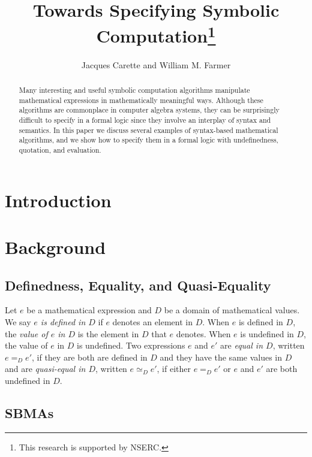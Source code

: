 \documentclass[fleqn]{llncs}
\title{Towards Specifying Symbolic Computation\thanks{This research is
    supported by NSERC.}}
\author{Jacques Carette and William M. Farmer}
\institute{%
Computing and Software, McMaster University, Canada\\
\url{http://www.cas.mcmaster.ca/~carette}\\
\url{http://imps.mcmaster.ca/wmfarmer}\\[1.5ex]
}
\begin{document}
\maketitle

\begin{abstract}

Many interesting and useful symbolic computation algorithms manipulate
mathematical expressions in mathematically meaningful ways.  Although
these algorithms are commonplace in computer algebra systems, they can
be surprisingly difficult to specify in a formal logic since they
involve an interplay of syntax and semantics.  In this paper we
discuss several examples of syntax-based mathematical algorithms, and
we show how to specify them in a formal logic with undefinedness,
quotation, and evaluation.

\end{abstract}

\iffalse 

\textbf{Keywords:} Symbolic computation, computer algebra systems,
reasoning about syntax, undefinedness, quotation and evaluation.

\fi

\section{Introduction}

\section{Background}

\subsection{Definedness, Equality, and Quasi-Equality}

Let $e$ be a mathematical expression and $D$ be a domain of
mathematical values.  We say \emph{$e$ is defined in $D$} if $e$
denotes an element in $D$.  When $e$ is defined in $D$, the
\emph{value of $e$ in $D$} is the element in $D$ that $e$ denotes.
When $e$ is undefined in $D$, the value of $e$ in $D$ is undefined.
Two expressions $e$ and $e'$ are \emph{equal in $D$}, written $e =_D
e'$, if they are both are defined in $D$ and they have the same values
in $D$ and are \emph{quasi-equal in $D$}, written $e \simeq_D e'$, if
either $e =_D e'$ or $e$ and $e'$ are both undefined in $D$.

\subsection{SBMAs}
\end{document}
